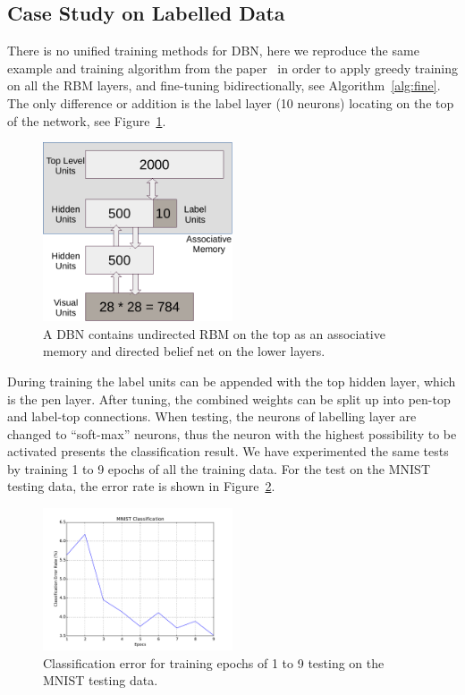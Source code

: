 \documentclass[11pt,twoside,a4paper]{article}
\begin{document}
	\subsection{Case Study on Labelled Data}
	There is no unified training methods for DBN, here we reproduce the same example and training algorithm from the paper~\cite{hinton2006fast} in order to apply greedy training on all the RBM layers, and fine-tuning bidirectionally, see Algorithm~\ref{alg:fine}.
	The only difference or addition is the label layer (10 neurons) locating on the top of the network, see Figure~\ref{Fig:case}.
		\begin{figure}[hbt]
				\centering
				\includegraphics[width=0.5\textwidth]{img/DBN.pdf}
				\caption{A DBN contains undirected RBM on the top as an associative memory and directed belief net on the lower layers.} 
				\label{Fig:case}
		\end{figure}
		
	During training the label units can be appended with the top hidden layer, which is the pen layer.
	After tuning, the combined weights can be split up into pen-top and label-top connections.
	When testing, the neurons of labelling layer are changed to ``soft-max'' neurons, thus the neuron with the highest possibility to be activated presents the classification result.
	We have experimented the same tests by training 1 to 9 epochs of all the training data.
	For the test on the MNIST testing data, the error rate is shown in Figure~\ref{Fig:class}.
		\begin{figure}[hbt]
				\centering
				\includegraphics[width=0.5\textwidth]{img/MNISTerror.pdf}
				\caption{Classification error for training epochs of 1 to 9 testing on the MNIST testing data.} 
				\label{Fig:class}
		\end{figure}	
	
\end{document}
